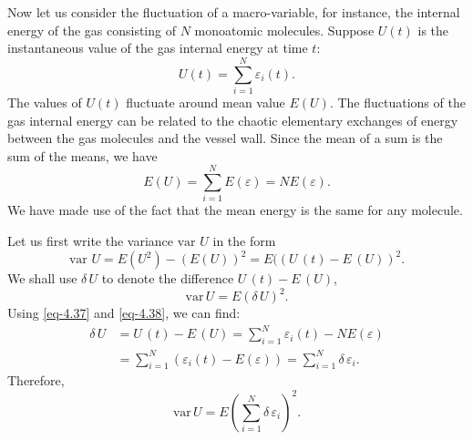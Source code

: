 Now let us consider the fluctuation of a macro-variable, for instance, the internal energy of the gas consisting of $N$ monoatomic molecules. Suppose $U (t)$ is the instantaneous value of the gas internal energy at time $t$:
\begin{equation}%
U(t) = \sum^{N}_{i =1} \varepsilon_{i} (t). 
\label{eq-4.37}
\end{equation}
The values of $U (t)$ fluctuate around mean value $E (U)$. The fluctuations of the gas internal energy can be related to the chaotic elementary exchanges of energy between the gas molecules and the vessel wall. Since the mean of a sum is the sum of the means, we have
\begin{equation}%
E(U) = \sum^{N}_{i =1} E(\varepsilon) = NE(\varepsilon).
\label{eq-4.38}
\end{equation}
We have made use of the fact that the mean energy is the same for any molecule.

Let us first write the variance $\textrm{var} \,\, U$ in the form 
\begin{equation*}%
\textrm{var} \,\, U = E(U^{2}) - (E(U))^{2} = E((U\,(t)- E\,(U))^{2}. 
\end{equation*}
We shall use $\delta \, U$ to denote the difference $U \,(t) - E \, (U)$,
\begin{equation}%
\textrm{var} \, U = E(\delta \, U)^{2}.
\label{eq-4.39}
\end{equation}
Using \eqref{eq-4.37} and \eqref{eq-4.38}, we can find:
\begin{align*}
\delta \,U & = U \, (t) - E \,(U)  = \sum_{i=1}^{N} \varepsilon_{i} (t) - N E (\varepsilon)\\
& = \sum_{i=1}^{N} (\varepsilon_{i} (t) - E (\varepsilon) ) = \sum_{i=1}^{N} \delta \, \varepsilon_{i}.
\end{align*}
Therefore,
\begin{equation}%
\textrm{var} \, U = E \left( \sum_{i=1}^{N} \delta \, \varepsilon_{i} \right)^{2}.
\label{eq-4.40}
\end{equation}

